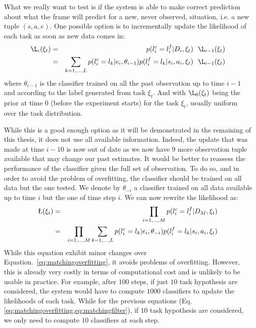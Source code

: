 What we really want to test is if the system is able to make correct prediction about what the frame will predict for a new, never observed, situation, i.e. a new tuple $(s,a,e)$. One possible option is to incrementally update the likelihood of each task as soon as new data comes in:
%
\begin{eqnarray}
\L_i(\xi_t) &=& p(l^c_i = l^f_i | D_i, \xi_t) ~~ \L_{i-1}(\xi_t) \nonumber \\ 
&=& \sum_{k = 1, \ldots, L} p(l^c_i = l_k | e_i, \theta_{i-1}) p(l^f_i = l_k | s_i, a_i, \xi_t) ~~ \L_{i-1}(\xi_t) 
\label{eq:matchingfilter} 
\end{eqnarray}
%
where $\theta_{i-1}$ is the classifier trained on all the past observation up to time $i-1$and according to the label generated from task $\xi_t$. And with $\L_{0}(\xi_t)$ being the prior at time 0 (before the experiment starts) for the task $\xi_t$, usually uniform over the task distribution.

While this is a good enough option as it will be demonstrated in the remaining of this thesis, it does not use all available information. Indeed, the update that was made at time $i-10$ is now out of date as we now have $9$ more observation tuple available that may change our past estimates. It would be better to reassess the performance of the classifier given the full set of observation. To do so, and in order to avoid the problem of overfitting, the classifier should be trained on all data but the one tested. We denote by $\theta_{-i}$ a classifier trained on all data available up to time $i$ but the one of time step $i$. We can now rewrite the likelihood as:
%
\begin{eqnarray}
\L(\xi_t) &=& \prod_{i = 1,\ldots,M} p(l^c_i = l^f_i | D_M, \xi_t) \nonumber \\ 
&=& \prod_{i = 1,\ldots,M} \sum_{k = 1, \ldots, L} p(l^c_i = l_k | e_i, \theta_{-i}) p(l^f_i = l_k | s_i, a_i, \xi_t) 
\label{eq:matching} 
\end{eqnarray}
%
While this equation exhibit minor changes over Equation.~\ref{eq:matchingoverfitting}, it avoids problems of overfitting. However, this is already very costly in terms of computational cost and is unlikely to be usable in practice. For example, after $100$ steps, if just $10$ task hypothesis are considered, the system would have to compute $1000$ classifiers to update the likelihoods of each task. While for the previous equations (Eq.\ref{eq:matchingoverfitting,eq:matchingfilter}), if $10$ task hypothesis are considered, we only need to compute $10$ classifiers at each step.

